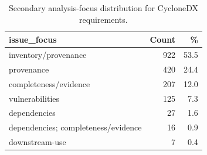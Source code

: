 \begin{table}[t]
\caption{Secondary analysis-focus distribution for CycloneDX requirements.}
\label{tab:cdx-issue-focus}
\centering
\small
\begin{tabularx}{\columnwidth}{@{}Xrr@{}}
\toprule
\textbf{issue\_focus} & \textbf{Count} & \textbf{\%} \\
\midrule
inventory/provenance & 922 & 53.5 \\
provenance & 420 & 24.4 \\
completeness/evidence & 207 & 12.0 \\
vulnerabilities & 125 & 7.3 \\
dependencies & 27 & 1.6 \\
dependencies; completeness/evidence & 16 & 0.9 \\
downstream-use & 7 & 0.4 \\
\bottomrule
\end{tabularx}
\end{table}
